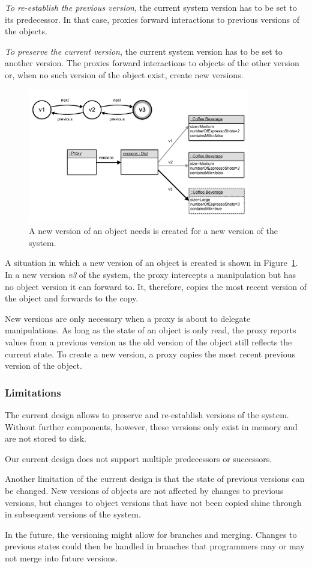 \emph{To re-establish the previous version}, the current system version has to be set to its predecessor.
In that case, proxies forward interactions to previous versions of the objects.

\emph{To preserve the current version}, the current system version has to be set to another version.
The proxies forward interactions to objects of the other version or, when no such version of the object exist, create new versions.

\begin{figure}[h]
    \centering
    \includegraphics[width=0.86\textwidth]{figures/4_approach/10_newVersionOfAnObject.pdf}
    \caption{A new version of an object needs is created for a new version of the system.}
    \label{fig:NewVersion}
\end{figure}

A situation in which a new version of an object is created is shown in Figure~\ref{fig:NewVersion}.
In a new version \emph{v3} of the system, the proxy intercepts a manipulation but has no object version it can forward to.
It, therefore, copies the most recent version of the object and forwards to the copy.

New versions are only necessary when a proxy is about to delegate manipulations.
As long as the state of an object is only read, the proxy reports values from a previous version as the old version of the object still reflects the current state.
To create a new version, a proxy copies the most recent previous version of the object.


\subsubsection{Limitations}

The current design allows to preserve and re-establish versions of the system.
Without further components, however, these versions only exist in memory and are not stored to disk.

Our current design does not support multiple predecessors or successors.

Another limitation of the current design is that the state of previous versions can be changed.
New versions of objects are not affected by changes to previous versions, but changes to object versions that have not been copied shine through in subsequent versions of the system.

In the future, the versioning might allow for branches and merging.
Changes to previous states could then be handled in branches that programmers may or may not merge into future versions.
